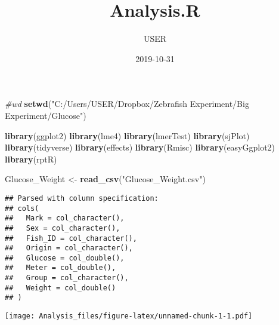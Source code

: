 \documentclass[]{article}
\title{Analysis.R}
\author{USER}
\date{2019-10-31}
\newenvironment{Shaded}{\begin{snugshade}}{\end{snugshade}}
\newcommand{\KeywordTok}[1]{\textcolor[rgb]{0.13,0.29,0.53}{\textbf{#1}}}
\newcommand{\StringTok}[1]{\textcolor[rgb]{0.31,0.60,0.02}{#1}}
\newcommand{\CommentTok}[1]{\textcolor[rgb]{0.56,0.35,0.01}{\textit{#1}}}
\newcommand{\OperatorTok}[1]{\textcolor[rgb]{0.81,0.36,0.00}{\textbf{#1}}}
\newcommand{\NormalTok}[1]{#1}
\begin{document}
\maketitle

\begin{Shaded}
\begin{Highlighting}[]
\CommentTok{#wd}
\KeywordTok{setwd}\NormalTok{(}\StringTok{"C:/Users/USER/Dropbox/Zebrafish Experiment/Big Experiment/Glucose"}\NormalTok{)}

\KeywordTok{library}\NormalTok{(ggplot2)}
\KeywordTok{library}\NormalTok{(lme4)}
\KeywordTok{library}\NormalTok{(lmerTest)}
\KeywordTok{library}\NormalTok{(sjPlot)}
\KeywordTok{library}\NormalTok{(tidyverse)}
\KeywordTok{library}\NormalTok{(effects)}
\KeywordTok{library}\NormalTok{(Rmisc)}
\KeywordTok{library}\NormalTok{(easyGgplot2)}
\KeywordTok{library}\NormalTok{(rptR)}

\NormalTok{Glucose_Weight <-}\StringTok{ }\KeywordTok{read_csv}\NormalTok{(}\StringTok{"Glucose_Weight.csv"}\NormalTok{)}
\end{Highlighting}
\end{Shaded}

\begin{verbatim}
## Parsed with column specification:
## cols(
##   Mark = col_character(),
##   Sex = col_character(),
##   Fish_ID = col_character(),
##   Origin = col_character(),
##   Glucose = col_double(),
##   Meter = col_double(),
##   Group = col_character(),
##   Weight = col_double()
## )
\end{verbatim}

\begin{Shaded}
\end{Shaded}

\texttt{[image: Analysis\_files/figure-latex/unnamed-chunk-1-1.pdf]}
\end{document}
